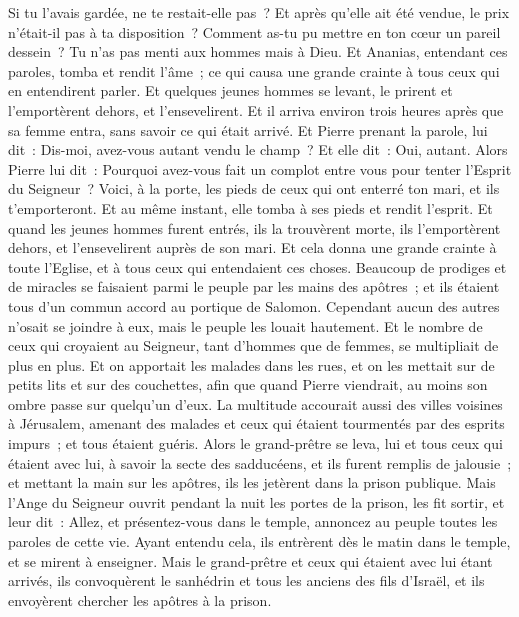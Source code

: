 \begin{multicols}{2}
Si tu l'avais gardée, ne te restait-elle pas~? Et après qu'elle ait été vendue, le prix n'était-il pas à ta disposition~? Comment as-tu pu mettre en ton cœur un pareil dessein~? Tu n'as pas menti aux hommes mais à Dieu.
Et Ananias, entendant ces paroles, tomba et rendit l'âme~; ce qui causa une grande crainte à tous ceux qui en entendirent parler.
Et quelques jeunes hommes se levant, le prirent et l'emportèrent dehors, et l'ensevelirent.
Et il arriva environ trois heures après que sa femme entra, sans savoir ce qui était arrivé.
Et Pierre prenant la parole, lui dit~: Dis-moi, avez-vous autant vendu le champ~? Et elle dit~: Oui, autant.
Alors Pierre lui dit~: Pourquoi avez-vous fait un complot entre vous pour tenter l'Esprit du Seigneur~? Voici, à la porte, les pieds de ceux qui ont enterré ton mari, et ils t'emporteront.
Et au même instant, elle tomba à ses pieds et rendit l'esprit. Et quand les jeunes hommes furent entrés, ils la trouvèrent morte, ils l'emportèrent dehors, et l'ensevelirent auprès de son mari.
Et cela donna une grande crainte à toute l'Eglise, et à tous ceux qui entendaient ces choses.
Beaucoup de prodiges et de miracles se faisaient parmi le peuple par les mains des apôtres~; et ils étaient tous d'un commun accord au portique de Salomon.
Cependant aucun des autres n'osait se joindre à eux, mais le peuple les louait hautement.
Et le nombre de ceux qui croyaient au Seigneur, tant d'hommes que de femmes, se multipliait de plus en plus.
Et on apportait les malades dans les rues, et on les mettait sur de petits lits et sur des couchettes, afin que quand Pierre viendrait, au moins son ombre passe sur quelqu'un d'eux.
La multitude accourait aussi des villes voisines à Jérusalem, amenant des malades et ceux qui étaient tourmentés par des esprits impurs~; et tous étaient guéris.
Alors le grand-prêtre se leva, lui et tous ceux qui étaient avec lui, à savoir la secte des sadducéens, et ils furent remplis de jalousie~;
et mettant la main sur les apôtres, ils les jetèrent dans la prison publique.
Mais l'Ange du Seigneur ouvrit pendant la nuit les portes de la prison, les fit sortir, et leur dit~:
Allez, et présentez-vous dans le temple, annoncez au peuple toutes les paroles de cette vie.
Ayant entendu cela, ils entrèrent dès le matin dans le temple, et se mirent à enseigner. Mais le grand-prêtre et ceux qui étaient avec lui étant arrivés, ils convoquèrent le sanhédrin et tous les anciens des fils d'Israël, et ils envoyèrent chercher les apôtres à la prison.

\end{multicols}
